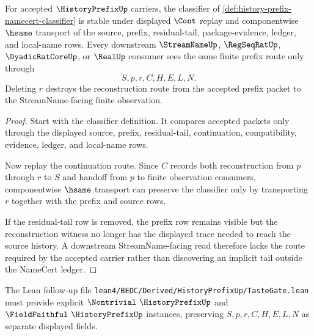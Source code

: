 \begin{theorem}
\label{thm:history-prefix-cont-stability}
For accepted $\HistoryPrefixUp$ carriers, the classifier of \autoref{def:history-prefix-namecert-classifier} is stable under displayed $\Cont$ replay and componentwise $\hsame$ transport of the source, prefix, residual-tail, package-evidence, ledger, and local-name rows. Every downstream $\StreamNameUp$, $\RegSeqRatUp$, $\DyadicRatCoreUp$, or $\RealUp$ consumer sees the same finite prefix route only through
$$
S,p,r,C,H,E,L,N.
$$
Deleting $r$ destroys the reconstruction route from the accepted prefix packet to the StreamName-facing finite observation.
\end{theorem}
\begin{proof}
Start with the classifier definition. It compares accepted packets only through the displayed source, prefix, residual-tail, continuation, compatibility, evidence, ledger, and local-name rows.

Now replay the continuation route. Since $C$ records both reconstruction from $p$ through $r$ to $S$ and handoff from $p$ to finite observation consumers, componentwise $\hsame$ transport can preserve the classifier only by transporting $r$ together with the prefix and source rows.

If the residual-tail row is removed, the prefix row remains visible but the reconstruction witness no longer has the displayed trace needed to reach the source history. A downstream StreamName-facing read therefore lacks the route required by the accepted carrier rather than discovering an implicit tail outside the NameCert ledger.
\end{proof}

The Lean follow-up file \texttt{lean4/BEDC/Derived/HistoryPrefixUp/TasteGate.lean} must provide explicit $\Nontrivial\ \HistoryPrefixUp$ and $\FieldFaithful\ \HistoryPrefixUp$ instances, preserving $S,p,r,C,H,E,L,N$ as separate displayed fields.


